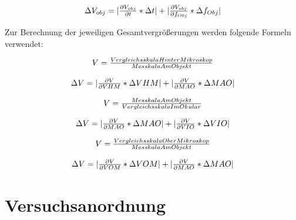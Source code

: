 \documentclass[12pt,a4paper,twoside]{article}
\begin{document}
\begin{equation}
    \label{eq:Unsicherheit_Objektivbrennweite}
    \centerline{$\Delta V_{obj} = \vert \frac{\partial V_{obj}}{\partial t} * \Delta t \vert + \vert \frac{\partial V_{obj}}{\partial f_{Obj}} * \Delta f_{Obj} \vert $}
\end{equation}

\noindent
Zur Berechnung der jeweiligen Gesamtvergrößerungen werden folgende Formeln verwendet:

\begin{equation}
    \label{eq:VergrößerungAM}
    \centerline{$V=\frac{Vergleichsskala Hinter Mikroskop}{Messkala Am Objekt}$}
\end{equation}

\begin{equation}
    \label{eq:Unsicherheit_VergrößerungAM}
    \centerline{$\Delta V = \vert \frac{\partial V}{\partial VHM} * \Delta VHM \vert + \vert \frac{\partial V}{\partial MAO} * \Delta MAO \vert $}
\end{equation}

\begin{equation}
    \label{eq:VergrößerungAM10x}
    \centerline{$V=\frac{Messkala Am Objekt}{Vergleichsskala Im Okular}$}
\end{equation}

\begin{equation}
    \label{eq:Unsicherheit_VergrößerungAM10x}
    \centerline{$\Delta V = \vert \frac{\partial V}{\partial MAO} * \Delta MAO \vert + \vert \frac{\partial V}{\partial VIO} * \Delta VIO \vert $}
\end{equation}

\begin{equation}
    \label{eq:VergrößerungNM}  
    \centerline{$V=\frac{Vergleichsskala Ober Mikroskop}{Messkala Am Objekt}$}
\end{equation}

\begin{equation}
    \label{eq:Unsicherheit_VergrößerungNM}
    \centerline{$\Delta V = \vert \frac{\partial V}{\partial VOM} * \Delta VOM \vert + \vert \frac{\partial V}{\partial MAO} * \Delta MAO \vert $}
\end{equation}



\section{Versuchsanordnung} %
\end{document}
